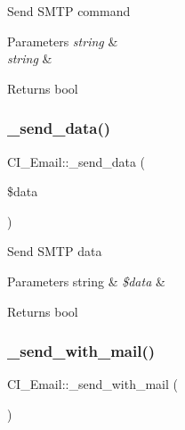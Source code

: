 Send S\+M\+TP command


\begin{DoxyParams}{Parameters}
{\em string} & \\
\hline
{\em string} & \\
\hline
\end{DoxyParams}
\begin{DoxyReturn}{Returns}
bool 
\end{DoxyReturn}
\mbox{\label{class_c_i___email_aaae3ab0f49aa24114786cf3fd9800798}} 
\subsubsection{\texorpdfstring{\+\_\+send\+\_\+data()}{\_send\_data()}}
{\footnotesize\ttfamily C\+I\+\_\+\+Email\+::\+\_\+send\+\_\+data (\begin{DoxyParamCaption}\item[{}]{\$data }\end{DoxyParamCaption})\hspace{0.3cm}{\ttfamily [protected]}}

Send S\+M\+TP data


\begin{DoxyParams}[1]{Parameters}
string & {\em \$data} & \\
\hline
\end{DoxyParams}
\begin{DoxyReturn}{Returns}
bool 
\end{DoxyReturn}
\mbox{\label{class_c_i___email_a3a12fbbf7152b394787a462f639b22a3}} 
\subsubsection{\texorpdfstring{\+\_\+send\+\_\+with\+\_\+mail()}{\_send\_with\_mail()}}
{\footnotesize\ttfamily C\+I\+\_\+\+Email\+::\+\_\+send\+\_\+with\+\_\+mail (\begin{DoxyParamCaption}{ }\end{DoxyParamCaption})\hspace{0.3cm}{\ttfamily [protected]}}

